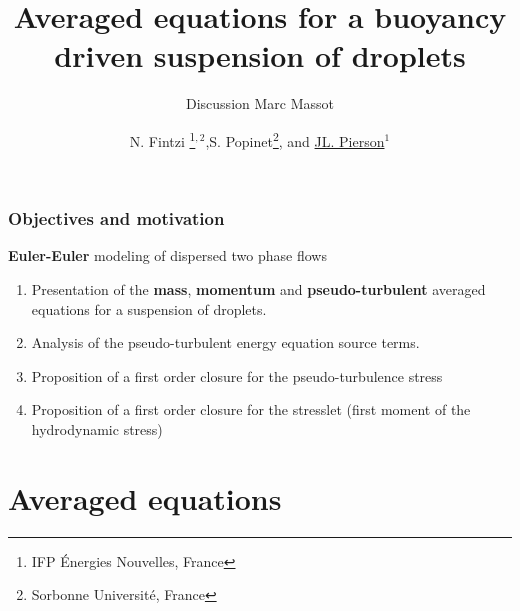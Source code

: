 \documentclass{sintefbeamer}
\title{Averaged equations for a buoyancy driven suspension of droplets}
\subtitle{Discussion Marc Massot}
\author{N. Fintzi \footnote{IFP \'Energies Nouvelles, France}$^{,2}$,S. Popinet\footnote{Sorbonne Universit\'e, France}, and \underline{JL. Pierson$^1$}}
\begin{document}
\maketitle
\section*{}

\begin{frame}
  \frametitle{Objectives and motivation}



\textbf{Euler-Euler} modeling of dispersed two phase flows 
\vfill
\begin{enumerate}
  \item Presentation of the \textbf{mass}, \textbf{momentum} and \textbf{pseudo-turbulent} averaged equations for a suspension of droplets. 
  \item Analysis of the pseudo-turbulent energy equation source terms. 
  \item Proposition of a first order closure for the pseudo-turbulence stress
  \item Proposition of a first order closure for the stresslet (first moment of the hydrodynamic stress)
\end{enumerate}





\end{frame}

\section{Averaged equations}
\end{document}
